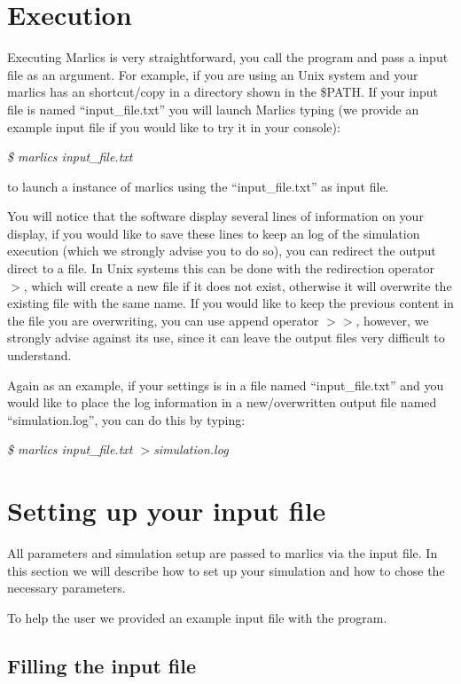 \documentclass{article}
\newcommand{\consoleline}[2][0.5cm]
{\vspace{#1}
\textit{{#2}}
\vspace{#1}
}
\begin{document}
\section{Execution}

Executing Marlics is very straightforward, you call the program and
pass a input file as an argument. For example, if you
are using an Unix system and your marlics has an shortcut/copy in a
directory shown in the \$PATH. If your input file is named
``input\_file.txt'' you will launch Marlics typing (we provide an
example input file if you would like to try it in your console):


\consoleline{\$ marlics input\_file.txt}


\noindent to launch a instance of marlics using the ``input\_file.txt'' as input
file.

You will notice that the software display several lines of information
on your display, if you would like to save these lines to keep an log
of the simulation execution (which we strongly advise you to do so),
you can redirect the output direct to a file. In Unix systems this can
be done with the redirection operator $>$, which will create a new
file if it does not exist, otherwise it will overwrite the existing
file with the same name. If you would like to keep the previous
content in the file you are overwriting, you can use append operator
$>>$, however, we strongly advise against its use, since it can leave
the output files very difficult to understand.

Again as an example, if your settings is in a file named ``input\_file.txt'' and you would like to place the log information in a new$/$overwritten  output file named ``simulation.log'', you can do this by typing:

\consoleline{\$ marlics  input\_file.txt $>$simulation.log}

\section{Setting up your input file}\label{sec:inputfile}

All parameters and simulation setup are passed to marlics via the
input file. In this section we will describe how to set up your
simulation and how to chose the necessary parameters.

To help the user we provided an example input file with the program.

\subsection{Filling the input file}
\end{document}
